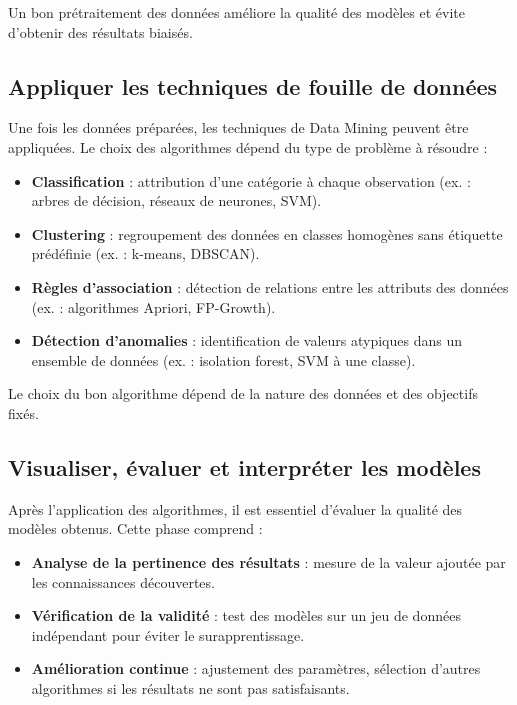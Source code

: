 \documentclass[a4paper,12pt]{report}
\begin{document}
    
         Un bon prétraitement des données améliore la qualité des modèles et évite d’obtenir des résultats biaisés.

     \subsection{Appliquer les techniques de fouille de données}

         Une fois les données préparées, les techniques de Data Mining peuvent être appliquées. Le choix des algorithmes dépend du type de problème à résoudre :
    
         \begin{itemize}
             \item \textbf{Classification} : attribution d’une catégorie à chaque observation (ex. : arbres de décision, réseaux de neurones, SVM).
        
             \item \textbf{Clustering} : regroupement des données en classes homogènes sans étiquette prédéfinie (ex. : k-means, DBSCAN).
        
             \item \textbf{Règles d’association} : détection de relations entre les attributs des données (ex. : algorithmes Apriori, FP-Growth).
        
             \item \textbf{Détection d’anomalies} : identification de valeurs atypiques dans un ensemble de données (ex. : isolation forest, SVM à une classe).
         \end{itemize}
    
         Le choix du bon algorithme dépend de la nature des données et des objectifs fixés.

     \subsection{Visualiser, évaluer et interpréter les modèles}
         Après l’application des algorithmes, il est essentiel d’évaluer la qualité des modèles obtenus. Cette phase comprend :
    
         \begin{itemize}
             \item \textbf{Analyse de la pertinence des résultats} : mesure de la valeur ajoutée par les connaissances découvertes.
        
             \item \textbf{Vérification de la validité} : test des modèles sur un jeu de données indépendant pour éviter le surapprentissage.
        
             \item \textbf{Amélioration continue} : ajustement des paramètres, sélection d’autres algorithmes si les résultats ne sont pas satisfaisants.
         \end{itemize}
    
\end{document}
